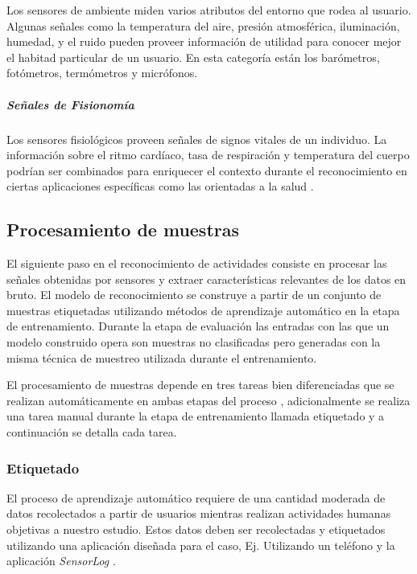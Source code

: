 Los sensores de ambiente miden varios atributos del entorno que rodea
al usuario. Algunas señales como la temperatura del aire, presión
atmosférica, iluminación, humedad, y el ruido pueden proveer información
de utilidad para conocer mejor el habitad particular de un usuario.
En esta categoría están los barómetros, fotómetros, termómetros y
micrófonos.

\subparagraph{Señales de Fisionomía}

Los sensores fisiológicos proveen señales de signos vitales de un
individuo. La información sobre el ritmo cardíaco, tasa de respiración
y temperatura del cuerpo podrían ser combinados para enriquecer el
contexto durante el reconocimiento en ciertas aplicaciones específicas
como las orientadas a la salud \cite{LaraLabrador2013}.

\subsection{Procesamiento de muestras}

\label{sec44:proceso-se=0000F1ales}El siguiente paso en el reconocimiento
de actividades consiste en procesar las señales obtenidas por sensores
y extraer características relevantes de los datos en bruto. El modelo
de reconocimiento se construye a partir de un conjunto de muestras
etiquetadas utilizando métodos de aprendizaje automático en la etapa
de entrenamiento. Durante la etapa de evaluación las entradas con
las que un modelo construido opera son muestras no clasificadas pero
generadas con la misma técnica de muestreo utilizada durante el entrenamiento.

El procesamiento de muestras depende en tres tareas bien diferenciadas
que se realizan automáticamente en ambas etapas del proceso ,
adicionalmente se realiza una tarea manual durante la etapa de entrenamiento
llamada etiquetado y a continuación se detalla cada tarea.

\subsubsection{Etiquetado}

\label{ssec44:labeling}El proceso de aprendizaje automático requiere
de una cantidad moderada de datos recolectados a partir de usuarios
mientras realizan actividades humanas objetivas a nuestro estudio.
Estos datos deben ser recolectadas y etiquetados utilizando una aplicación
diseñada para el caso, Ej. Utilizando un teléfono 
y la aplicación \emph{SensorLog} \cite{Alan2014s}. 

